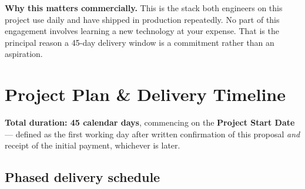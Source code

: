 \documentclass[11pt,a4paper]{article}
\begin{document}
\vspace{8pt}
\begin{keybox}
\textbf{Why this matters commercially.} This is the stack both engineers on this project
use daily and have shipped in production repeatedly. No part of this engagement involves
learning a new technology at your expense. That is the principal reason a 45-day
delivery window is a commitment rather than an aspiration.
\end{keybox}

\clearpage
\section{Project Plan \& Delivery Timeline}

\textbf{Total duration: 45 calendar days}, commencing on the \textbf{Project Start Date}
--- defined as the first working day after written confirmation of this proposal
\emph{and} receipt of the initial payment, whichever is later.

\subsection{Phased delivery schedule}
\end{document}
